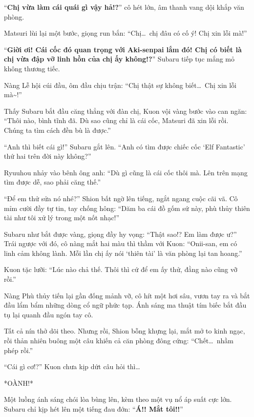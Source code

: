 \documentclass[../main.tex]{subfiles}
\begin{document}
``\textbf{Chị vừa làm cái quái gì vậy hả!?}'' cô hét lớn, âm thanh vang dội khắp văn phòng.

Matsuri lùi lại một bước, giọng run bắn: ``Chị\dots\ chị đâu có cố ý! Chị xin lỗi mà!''

``\textbf{Giời ơi! Cái cốc đó quan trọng với Aki-senpai lắm đó! Chị có biết là chị vừa đập vỡ linh hồn của chị ấy không!?}'' Subaru tiếp tục mắng mỏ không thương tiếc.

Nàng Lễ hội cúi đầu, ôm đầu chịu trận: ``Chị thật sự không biết\dots\ Chị xin lỗi mà\~{}!''

Thấy Subaru bắt đầu căng thẳng với đàn chị, Kuon vội vàng bước vào can ngăn: ``Thôi nào, bình tĩnh đã. Dù sao cũng chỉ là cái cốc, Matsuri đã xin lỗi rồi. Chúng ta tìm cách đền bù là được.''

``Anh thì biết cái gì!'' Subaru gắt lên. ``Anh có tìm được chiếc cốc `Elf Fantastic' thứ hai trên đời này không?''

Ryuuhou nhảy vào bênh ông anh: ``Dù gì cũng là cái cốc thôi mà. Lên trên mạng tìm được dễ, sao phải căng thế.''

``Để em thử sửa nó nhé?'' Shion bất ngờ lên tiếng, ngắt ngang cuộc cãi vã. Cô mỉm cười đầy tự tin, tay chống hông: ``Dăm ba cái đồ gốm sứ này, phù thủy thiên tài như tôi xử lý trong một nốt nhạc!''

Subaru như bắt được vàng, giọng đầy hy vọng: ``Thật sao!? Em làm được ư?'' Trái ngược với đó, cô nàng mắt hai màu thì thầm với Kuon: ``Onii-san, em có linh cảm không lành. Mỗi lần chị ấy nói `thiên tài' là văn phòng lại tan hoang.''

Kuon tặc lưỡi: ``Lúc nào chả thế. Thôi thì cứ để em ấy thử, đằng nào cũng vỡ rồi.''

Nàng Phù thủy tiến lại gần đống mảnh vỡ, cô hít một hơi sâu, vươn tay ra và bắt đầu lẩm bẩm những dòng cổ ngữ phức tạp. Ánh sáng ma thuật tím biếc bắt đầu tụ lại quanh đầu ngón tay cô.


Tất cả nín thở dõi theo. Nhưng rồi, Shion bỗng khựng lại, mắt mở to kinh ngạc, rồi thản nhiên buông một câu khiến cả căn phòng đông cứng: ``Chết\dots\ nhầm phép rồi.''

``Cái gì cơ!?'' Kuon chưa kịp dứt câu hỏi thì\dots

*OÀNH!*

Một luồng ánh sáng chói lòa bùng lên, kèm theo một vụ nổ áp suất cực lớn. Subaru chỉ kịp hét lên một tiếng đau đớn: ``\textbf{Á!! Mắt tôi!!}''
\end{document}
